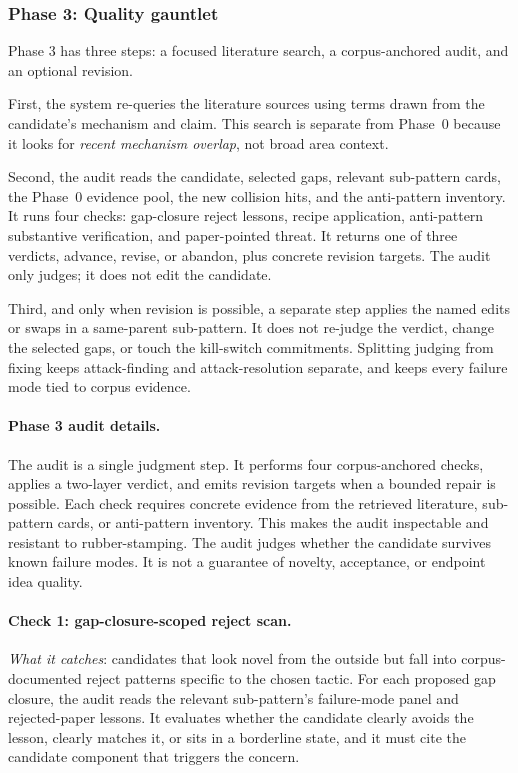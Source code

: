 \documentclass[10pt,a4paper]{article}
\begin{document}
\subsubsection{Phase 3: Quality gauntlet}

Phase 3 has three steps: a focused literature search, a corpus-anchored audit, and an optional revision.

First, the system re-queries the literature sources using terms drawn from the candidate's mechanism and claim. This search is separate from Phase~0 because it looks for \emph{recent mechanism overlap}, not broad area context.

Second, the audit reads the candidate, selected gaps, relevant sub-pattern cards, the Phase~0 evidence pool, the new collision hits, and the anti-pattern inventory. It runs four checks: gap-closure reject lessons, recipe application, anti-pattern substantive verification, and paper-pointed threat. It returns one of three verdicts, advance, revise, or abandon, plus concrete revision targets. The audit only judges; it does not edit the candidate.

Third, and only when revision is possible, a separate step applies the named edits or swaps in a same-parent sub-pattern. It does not re-judge the verdict, change the selected gaps, or touch the kill-switch commitments. Splitting judging from fixing keeps attack-finding and attack-resolution separate, and keeps every failure mode tied to corpus evidence.

\paragraph{Phase 3 audit details.} The audit is a single judgment step. It performs four corpus-anchored checks, applies a two-layer verdict, and emits revision targets when a bounded repair is possible. Each check requires concrete evidence from the retrieved literature, sub-pattern cards, or anti-pattern inventory. This makes the audit inspectable and resistant to rubber-stamping. The audit judges whether the candidate survives known failure modes. It is not a guarantee of novelty, acceptance, or endpoint idea quality.

\paragraph{Check 1: gap-closure-scoped reject scan.} \emph{What it catches}: candidates that look novel from the outside but fall into corpus-documented reject patterns specific to the chosen tactic. For each proposed gap closure, the audit reads the relevant sub-pattern's failure-mode panel and rejected-paper lessons. It evaluates whether the candidate clearly avoids the lesson, clearly matches it, or sits in a borderline state, and it must cite the candidate component that triggers the concern.
\end{document}
